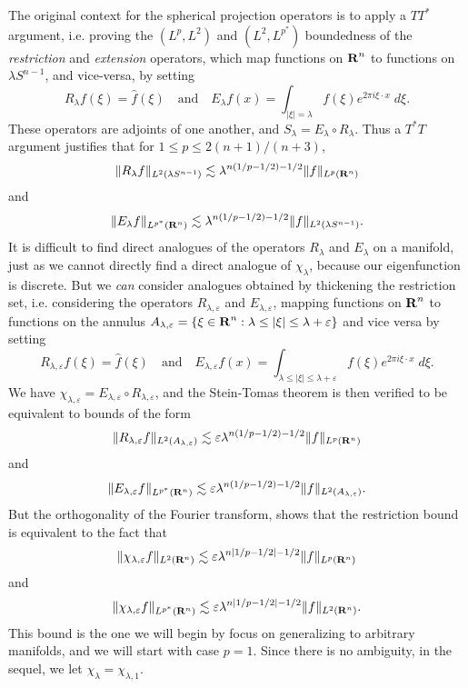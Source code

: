 The original context for the spherical projection operators is to apply a $TT^*$ argument, i.e. proving the $(L^p,L^2)$ and $(L^2,L^{p^*})$ boundedness of the \emph{restriction} and \emph{extension} operators, which map functions on $\operatorname{\mathbf{R}}^n$ to functions on $\lambda S^{n-1}$, and vice-versa, by setting
%
\[ R_\lambda f(\xi) = \widehat{f}(\xi) \quad\text{and}\quad E_\lambda f(x) = \int_{|\xi| = \lambda} f(\xi) e^{2 \pi i \xi \cdot x}\; d\xi. \]
%
These operators are adjoints of one another, and $S_\lambda = E_\lambda \circ R_\lambda$. Thus a $T^*T$ argument justifies that for $1 \leq p \leq 2(n+1)/(n+3)$,
%
\[ \| R_\lambda f \|_{L^2(\lambda S^{n-1})} \lesssim \lambda^{n(1/p - 1/2) - 1/2} \| f \|_{L^p(\operatorname{\mathbf{R}}^n)} \]
%
and
%
\[ \| E_\lambda f \|_{L^{p^*}(\operatorname{\mathbf{R}}^n)} \lesssim \lambda^{n(1/p - 1/2) - 1/2} \| f \|_{L^2(\lambda S^{n-1})}. \]
%
It is difficult to find direct analogues of the operators $R_\lambda$ and $E_\lambda$ on a manifold, just as we cannot directly find a direct analogue of $\chi_\lambda$, because our eigenfunction is discrete. But we \emph{can} consider analogues obtained by thickening the restriction set, i.e. considering the operators $R_{\lambda,\varepsilon}$ and $E_{\lambda,\varepsilon}$, mapping functions on $\operatorname{\mathbf{R}}^n$ to functions on the annulus $A_{\lambda,\varepsilon} = \{ \xi \in \operatorname{\mathbf{R}}^n: \lambda \leq |\xi| \leq \lambda + \varepsilon \}$ and vice versa by setting
%
\[ R_{\lambda,\varepsilon} f(\xi) = \widehat{f}(\xi) \quad\text{and}\quad E_{\lambda,\varepsilon} f(x) = \int_{\lambda \leq |\xi| \leq \lambda + \varepsilon} f(\xi) e^{2 \pi i \xi \cdot x}\; d\xi. \]
%
We have $\chi_{\lambda,\varepsilon} = E_{\lambda,\varepsilon} \circ R_{\lambda,\varepsilon}$, and the Stein-Tomas theorem is then verified to be equivalent to bounds of the form
%
\[ \| R_{\lambda,\varepsilon} f \|_{L^2(A_{\lambda,\varepsilon})} \lesssim \varepsilon \lambda^{n(1/p - 1/2) - 1/2} \| f \|_{L^p(\operatorname{\mathbf{R}}^n)} \]
%
and
%
\[ \| E_{\lambda,\varepsilon} f \|_{L^{p^*}(\operatorname{\mathbf{R}}^n)} \lesssim \varepsilon \lambda^{n(1/p - 1/2) - 1/2} \| f \|_{L^2(A_{\lambda,\varepsilon})}. \]
%
But the orthogonality of the Fourier transform, shows that the restriction bound is equivalent to the fact that
%
\[ \| \chi_{\lambda,\varepsilon} f \|_{L^2(\operatorname{\mathbf{R}}^n)} \lesssim \varepsilon \lambda^{n|1/p - 1/2| - 1/2} \| f \|_{L^p(\operatorname{\mathbf{R}}^n)} \]
%
and
%
\[ \| \chi_{\lambda,\varepsilon} f \|_{L^{p^*}(\operatorname{\mathbf{R}}^n)} \lesssim \varepsilon \lambda^{n|1/p - 1/2| - 1/2} \| f \|_{L^2(\operatorname{\mathbf{R}}^n)}. \]
%
This bound is the one we will begin by focus on generalizing to arbitrary manifolds, and we will start with case $p = 1$. Since there is no ambiguity, in the sequel, we let $\chi_\lambda = \chi_{\lambda,1}$.

